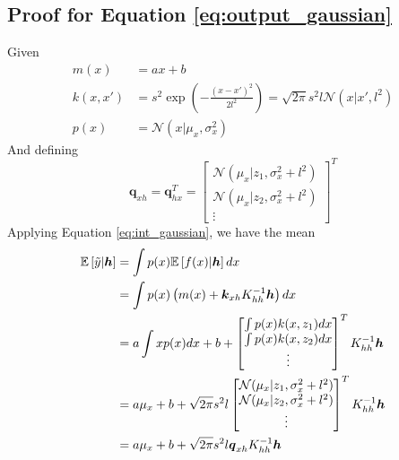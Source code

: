 \documentclass{article}
\begin{document}
\begin{appendices}
    \subsection{Proof for Equation \ref{eq:output_gaussian}}
    Given 
    \begin{equation}
        \begin{aligned}
            m(x)&=ax+b \\
            k(x,x')&=s^2 \exp(-\frac{(x-x')^2}{2l^2})=\sqrt{2\pi}s^2l\mathcal{N}(x|x',l^2) \\
            p(x)&=\mathcal{N}(x|\mu_x,\sigma_x^2)
        \end{aligned}
    \end{equation}
    And defining 
    \begin{equation}
        \boldsymbol{q}_{xh}=\boldsymbol{q}_{hx}^T=\begin{bmatrix}
            \mathcal{N}(\mu_x|z_1,\sigma_x^2+l^2) \\
            \mathcal{N}(\mu_x|z_2,\sigma_x^2+l^2) \\
            \vdots
        \end{bmatrix}^T
    \end{equation}
    Applying Equation \ref{eq:int_gaussian}, we have the mean
    \begin{equation}
        \begin{aligned}
            \mathbb{E}\left[\Tilde{y}|\boldsymbol{h}\right]&=\int p(x)\mathbb{E}\left[f(x)|\boldsymbol{h}\right]dx \\
            &=\int p(x)\left(m(x)+\boldsymbol{k}_{xh}K_{hh}^{-1}\boldsymbol{h}\right)dx \\
            &=a\int xp(x)dx + b + \begin{bmatrix}
                \int p(x)k(x,z_1)dx \\
                \int p(x)k(x,z_2)dx \\
                \vdots
            \end{bmatrix}^T K_{hh}^{-1}\boldsymbol{h} \\
            &=a\mu_x+b+\sqrt{2\pi}s^2l\begin{bmatrix}
                \mathcal{N}(\mu_x|z_1,\sigma_x^2+l^2) \\
                \mathcal{N}(\mu_x|z_2,\sigma_x^2+l^2) \\
                \vdots
            \end{bmatrix}^TK_{hh}^{-1}\boldsymbol{h} \\
            &=a\mu_x+b+\sqrt{2\pi}s^2l\boldsymbol{q}_{xh}K_{hh}^{-1}\boldsymbol{h}

\end{aligned}
\end{equation}
\end{appendices}
\end{document}
